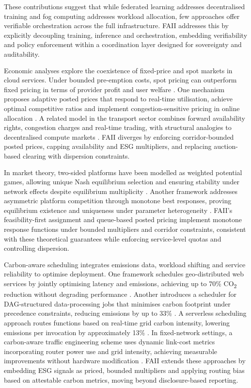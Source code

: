 \documentclass[oneside,10pt]{swissi}
\begin{document}
These contributions suggest that while federated learning addresses decentralised training and fog computing addresses workload allocation, few approaches offer verifiable orchestration across the full infrastructure. FAII addresses this by explicitly decoupling training, inference and orchestration, embedding verifiability and policy enforcement within a coordination layer designed for sovereignty and auditability.

Economic analyses explore the coexistence of fixed-price and spot markets in cloud services. Under bounded pre-emption costs, spot pricing can outperform fixed pricing in terms of provider profit and user welfare \cite{Dierks2021}. One mechanism proposes adaptive posted prices that respond to real-time utilisation, achieve optimal competitive ratios and implement congestion-sensitive pricing in online allocation \cite{Zhang2017}. A related model in the transport sector combines forward availability rights, congestion charges and real-time trading, with structural analogies to decentralised compute markets \cite{Cramton2015}. FAII diverges by enforcing corridor-bounded posted prices, capping availability and ESG multipliers, and replacing auction-based clearing with dispersion constraints.

In market theory, two-sided platforms have been modelled as weighted potential games, allowing unique Nash equilibrium selection and ensuring stability under network effects despite equilibrium multiplicity \cite{Chan2019}. Another framework addresses asymmetric platform competition through monotone best responses, proving equilibrium existence and uniqueness under parameter heterogeneity \cite{Sato2022}. FAII’s feasibility-first assignment and queue-based posted pricing implement monotone response functions under bounded multipliers and corridor constraints, consistent with these theoretical guarantees while enforcing service-level quotas and controlling dispersion.

Carbon-aware scheduling integrates emissions data, workload shifting and service reliability to optimise deployment. One framework schedules geo-distributed web services by jointly optimising latency and emissions, achieving up to 70\% CO\textsubscript{2} reduction without degrading performance \cite{Souza2024}. Another introduces a scheduler for DAG-structured data-processing jobs that minimises carbon footprint under precedence constraints, reducing emissions by up to 33\% \cite{Lechowicz2025}. A serverless scheduling approach routes functions based on real-time grid carbon intensity, lowering emissions per invocation by approximately 13\% \cite{Chadha2023}. In fixed-network settings, a carbon-aware traffic engineering scheme uses dynamic link-cost metrics incorporating router power use and grid intensity, achieving measurable improvements without hardware modification \cite{ElZahr2023}. FAII extends these approaches by embedding ESG signals as priced, bounded multipliers and applying routing bias based on attestable carbon metrics, moving beyond disclosure-based reporting.
\end{document}
